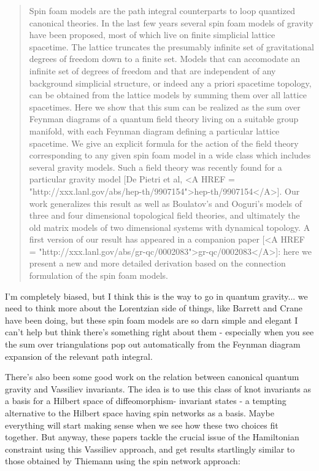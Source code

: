 \begin{quote}
     Spin foam models are the path integral counterparts to loop
     quantized canonical theories. In the last few years several spin
     foam models of gravity have been proposed, most of which live on
     finite simplicial lattice spacetime. The lattice truncates the
     presumably infinite set of gravitational degrees of freedom down to
     a finite set. Models that can accomodate an infinite set of degrees
     of freedom and that are independent of any background simplicial
     structure, or indeed any a priori spacetime topology, can be
     obtained from the lattice models by summing them over all lattice
     spacetimes. Here we show that this sum can be realized as the sum
     over Feynman diagrams of a quantum field theory living on a
     suitable group manifold, with each Feynman diagram defining a
     particular lattice spacetime. We give an explicit formula for the
     action of the field theory corresponding to any given spin foam
     model in a wide class which includes several gravity models. Such a
     field theory was recently found for a particular gravity model [De
     Pietri et al, <A HREF = "http://xxx.lanl.gov/abs/hep-th/9907154">hep-th/9907154</A>]. Our work generalizes this result as
     well as Boulatov's and Ooguri's models of three and four
     dimensional topological field theories, and ultimately the old
     matrix models of two dimensional systems with dynamical topology. A
     first version of our result has appeared in a companion paper
     [<A HREF = "http://xxx.lanl.gov/abs/gr-qc/0002083">gr-qc/0002083</A>]: here we present a new and more detailed derivation
     based on the connection formulation of the spin foam models.
\end{quote}

I'm completely biased, but I think this is the way to go in quantum
gravity... we need to think more about the Lorentzian side of things,
like Barrett and Crane have been doing, but these spin foam models are
so darn simple and elegant I can't help but think there's something
right about them - especially when you see the sum over triangulations
pop out automatically from the Feynman diagram expansion of the relevant
path integral.

There's also been some good work on the relation between canonical
quantum gravity and Vassiliev invariants.  The idea is to use this class
of knot invariants as a basis for a Hilbert space of diffeomorphism-
invariant states - a tempting alternative to the Hilbert space having
spin networks as a basis.  Maybe everything will start making sense 
when we see how these two choices fit together.  But anyway, these
papers tackle the crucial issue of the Hamiltonian constraint using
this Vassiliev approach, and get results startlingly similar to those
obtained by Thiemann using the spin network approach:

